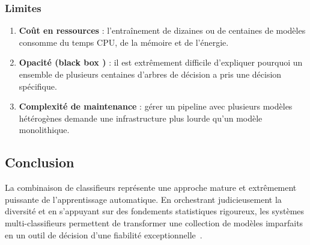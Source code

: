 \subsubsection{Limites}

\begin{enumerate}
  \item \textbf{Coût en ressources} : l'entraînement de dizaines ou de centaines de modèles consomme
  du temps CPU, de la mémoire et de l'énergie.

  \item \textbf{Opacité (\og black box \fg{})} : il est extrêmement difficile d'expliquer pourquoi un ensemble de
  plusieurs centaines d'arbres de décision a pris une décision spécifique.

  \item \textbf{Complexité de maintenance} : gérer un pipeline avec plusieurs modèles hétérogènes
  demande une infrastructure plus lourde qu'un modèle monolithique.
\end{enumerate}

\subsection{Conclusion}

La combinaison de classifieurs représente une approche mature et extrêmement puissante de
l'apprentissage automatique. En orchestrant judicieusement la diversité et en s'appuyant sur
des fondements statistiques rigoureux, les systèmes multi-classifieurs permettent de
transformer une collection de modèles imparfaits en un outil de décision d'une fiabilité
exceptionnelle~\cite{ibm_ensemble_learning,ultralytics_ensemble_role,gfg_ensemble_learning,luisfredgs_mcs_intro}.


